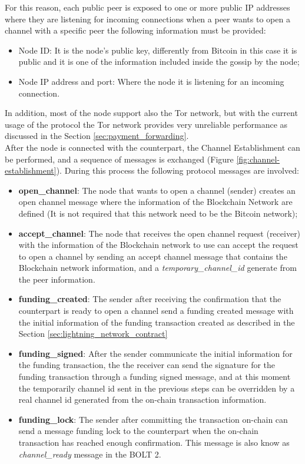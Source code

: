 For this reason, each public peer is exposed to one or more public IP addresses where
they are listening for incoming connections when a peer wants to open
a channel with a specific peer the following information must be provided:

\begin{itemize}
  \item Node ID: It is the node's public key, differently from Bitcoin in this case it is public and it is one of the information included inside the gossip by the node;
  \item Node IP address and port: Where the node it is listening for an incoming connection.
\end{itemize}

In addition, most of the node support also the Tor network, but with the current usage of the protocol the Tor network provides very unreliable
performance as discussed in the Section \ref{sec:payment_forwarding}.\\
After the node is connected with the counterpart, the Channel Establishment can be performed, and a sequence
of messages is exchanged (Figure \ref{fig:channel-establishment}). During this process
the following protocol messages are involved:

\begin{itemize}
  \item {\bf open\_channel}: The node that wants to open a channel (sender) creates an open channel message where the information of the
        Blockchain Network are defined (It is not required that this network need to be the Bitcoin network);
  \item {\bf accept\_channel}: The node that receives the open channel request (receiver) with the information of the Blockchain network to use
        can accept the request to open a channel by sending an accept channel message that contains the Blockchain network information, and
        a \emph{temporary\_channel\_id} generate from the peer information.
  \item {\bf funding\_created}: The sender after receiving the confirmation that the counterpart is ready to open a channel
        send a funding created message with the initial information of the funding transaction created as described in the Section \ref{sec:lightning_network_contract}
  \item {\bf funding\_signed}: After the sender communicate the initial information for the funding transaction, the
        the receiver can send the signature for the funding transaction through a funding signed message, and at this moment the temporarily
        channel id sent in the previous steps can be overridden by a real channel id generated from the on-chain transaction information.
  \item {\bf funding\_lock}: The sender after committing the transaction on-chain can send a message funding lock to the counterpart when
        the on-chain transaction has reached enough confirmation. This message is also know as \emph{channel\_ready} message in the BOLT 2\cite{bolt2}.
\end{itemize}

